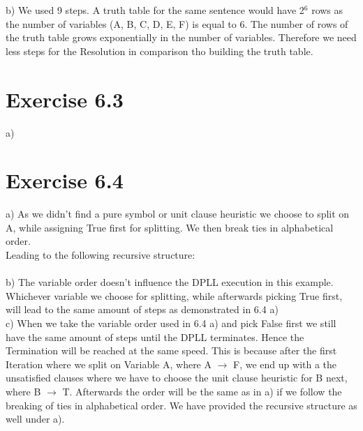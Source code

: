 \documentclass[12pt]{article}
\begin{document}
b) We used 9 steps. A truth table for the same sentence would have 2$^6$ rows as the number of variables (A, B, C, D, E, F) is equal to 6. The number of rows of the truth table grows exponentially in the number of variables. Therefore we need less steps for the Resolution in comparison tho building the truth table.\\


\section*{Exercise 6.3}
a) \\

\section*{Exercise 6.4}
a) As we didn't find a pure symbol or unit clause heuristic we choose to split on A, while assigning True first for splitting. We then break ties in alphabetical order.\\
Leading to the following recursive structure:\\ \\
b) The variable order doesn't influence the DPLL execution in this example. Whichever variable we choose for splitting, while afterwards picking True first, will lead to the same amount of steps as demonstrated in 6.4 a)\\
c) When we take the variable order used in 6.4 a) and pick False first we still have the same amount of steps until the DPLL terminates. Hence the Termination will be reached at the same speed. This is because after the first Iteration where we split on Variable A, where A $\to$ F, we end up with a the unsatisfied clauses where we have to choose the unit clause heuristic for B next, where B $\to$ T. Afterwards the order will be the same as in a) if we follow the breaking of ties in alphabetical order. We have provided the recursive structure as well under a).\\
\end{document}
